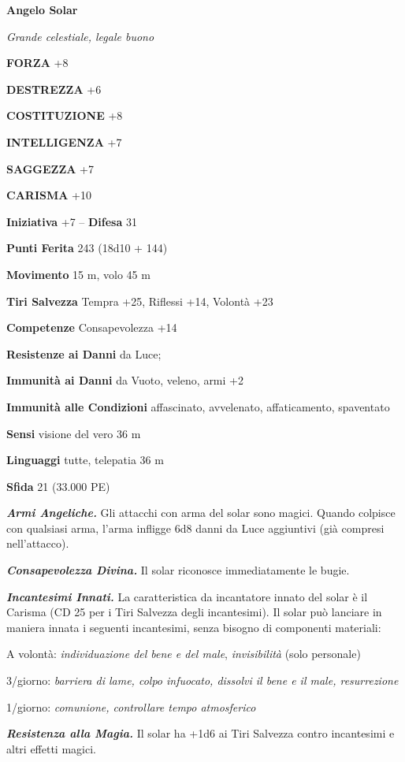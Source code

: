\begin{multicols}{2}
\medskip{}\textbf{Angelo Solar}

\emph{Grande celestiale, legale buono}

\textbf{FORZA} +8

\textbf{DESTREZZA} +6

\textbf{COSTITUZIONE} +8

\textbf{INTELLIGENZA} +7

\textbf{SAGGEZZA} +7

\textbf{CARISMA} +10

\textbf{Iniziativa} +7 -- \textbf{Difesa} 31

\textbf{Punti Ferita} 243 (18d10 + 144) 

\textbf{Movimento} 15 m, volo 45 m

\textbf{Tiri Salvezza} Tempra +25, Riflessi +14, Volontà +23

\textbf{Competenze} Consapevolezza +14

\textbf{Resistenze ai Danni} da Luce;

\textbf{Immunità ai Danni} da Vuoto, veleno, armi +2

\textbf{Immunità alle Condizioni} affascinato, avvelenato, affaticamento, spaventato

\textbf{Sensi} visione del vero 36 m

\textbf{Linguaggi} tutte, telepatia 36 m 

\textbf{Sfida} 21 (33.000 PE)

\emph{\textbf{Armi Angeliche.}} Gli attacchi con arma del solar sono magici. Quando colpisce con qualsiasi arma, l'arma infligge 6d8 danni da Luce aggiuntivi (già compresi nell'attacco).

\emph{\textbf{Consapevolezza Divina.}} Il solar riconosce immediatamente le bugie.

\emph{\textbf{Incantesimi Innati.}} La caratteristica da incantatore innato del solar è il Carisma (CD 25 per i Tiri Salvezza degli incantesimi). Il solar può lanciare in maniera innata i seguenti incantesimi, senza bisogno di componenti materiali:

A volontà: \emph{individuazione del bene e del male}, \emph{invisibilità} (solo personale)

3/giorno: \emph{barriera di lame, colpo infuocato, dissolvi il bene e il male, resurrezione}

1/giorno: \emph{comunione, controllare tempo atmosferico}

\emph{\textbf{Resistenza alla Magia.}} Il solar ha +1d6 ai Tiri Salvezza contro incantesimi e altri effetti magici.


\end{multicols}

